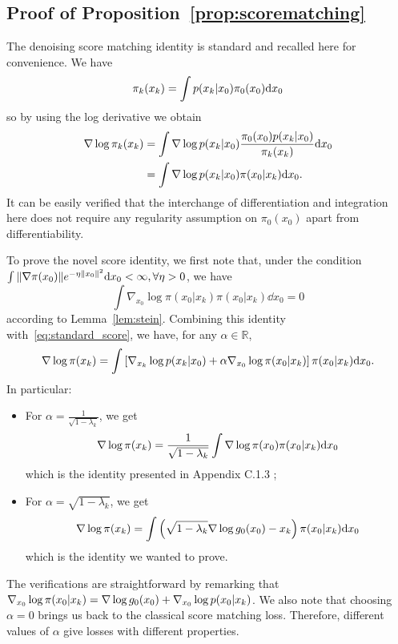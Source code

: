 \documentclass{article}
\theoremstyle{plain}
\theoremstyle{definition}
\theoremstyle{remark}
\begin{document}
\subsection{Proof of Proposition~\ref{prop:scorematching}}
\label{proof_log_g_res}
The denoising score matching identity is standard and recalled here for convenience. We have
\begin{align*}
	\pi_k(x_k)=\int p(x_k|x_0) \pi_0(x_0)  \mathrm{d} x_0
\end{align*}
so by using the log derivative we obtain
\begin{align}
	\nabla \log \pi_k(x_k) & =\int \nabla \log p(x_k|x_0) \frac{\pi_0(x_0) p(x_k|x_0)}{\pi_k(x_k)} \mathrm{d} x_0 \\
	                       & =\int \nabla \log p(x_k|x_0) \pi(x_0|x_k) \mathrm{d} x_0. \label{eq:standard_score}
\end{align}
It can be easily verified that the interchange of differentiation and integration here does not require any regularity assumption on $\pi_0(x_0)$ apart from differentiability.

To prove the novel score identity, we first note that, under the condition $\int \norm{\nabla \pi(x_0)} e^{-\eta\norm{x_0}^2} \dd x_0 < \infty, \forall \eta > 0$, we have
\begin{equation}
	\label{eq:stein}
	\int \nabla_{x_0}\log \pi(x_0|x_k) \pi(x_0|x_k) \dd x_0 = 0
\end{equation}
according to Lemma~\ref{lem:stein}. Combining this identity with~\eqref{eq:standard_score}, we have, for any $\alpha \in \mathbb R$,
\begin{equation*}
	\nabla\log \pi(x_k) = \int \left[ \nabla_{x_k} \log p(x_k|x_0) + \alpha\nabla_{x_0} \log \pi(x_0|x_k) \right] \pi(x_0|x_k) \dd x_0.
\end{equation*}
In particular:
\begin{itemize}
	\item For $\alpha = \frac{1}{\sqrt{1-\lambda_k}}$, we get
	      \begin{equation*}
		      \nabla\log \pi(x_k) = \frac{1}{\sqrt{1-\lambda_k}} \int \nabla\log \pi(x_0) \pi(x_0|x_k) \dd x_0
	      \end{equation*}
	      which is the identity presented in Appendix C.1.3 \citep{debortoli2021diffusion};
	\item For $\alpha = \sqrt{1-\lambda_k}$, we get
	      \begin{equation*}
		      \nabla\log \pi(x_k)=  \int\left( \sqrt{1-\lambda_k} \nabla\log g_0(x_0) - x_k \right) \pi(x_0|x_k) \dd x_0
	      \end{equation*}
	      which is the identity we wanted to prove.
\end{itemize}
The verifications are straightforward by remarking that $\nabla_{x_0} \log \pi(x_0|x_k) = \nabla\log g_0(x_0) + \nabla_{x_0} \log p(x_0|x_k)$. We also note that choosing $\alpha = 0$ brings us back to the classical score matching loss. Therefore, different values of $\alpha$ give losses with different properties.
\end{document}
